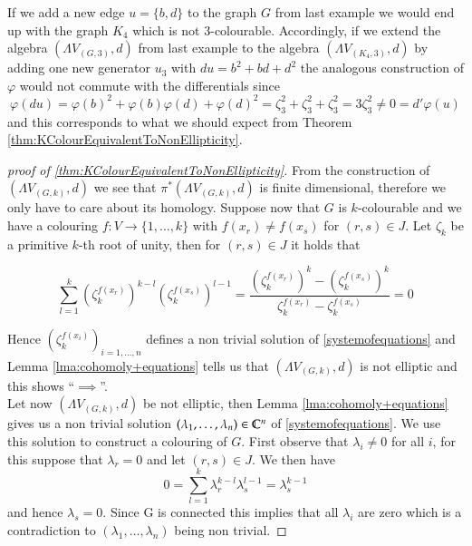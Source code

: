 \begin{Remark}
 If we add a new edge $ u = \lbrace b,d \rbrace$ to the graph $G$ from last example we would end up with the graph $K_4$ which
 is not $3$-colourable. Accordingly, if we extend the algebra $(\Lambda V_{(G,3)},d)$ from last example to the algebra
 $(\Lambda V_{(K_4,3)}, d)$ by adding one new generator $u_3$ with $du = b^2 + bd + d^2$ the analogous construction of $\varphi$ would
 not commute with the differentials since
 $$ \varphi(du) = \varphi(b)^2 + \varphi(b)\varphi(d) + \varphi(d)^2 = \zeta_3^2 + \zeta_3^2 + \zeta_3^2 = 3 \zeta_3^2 
 \neq 0 = d' \varphi(u)$$ 
 and this corresponds to what we should expect from Theorem \ref{thm:KColourEquivalentToNonEllipticity}.
\end{Remark}

 
 \begin{proof}[proof of \ref{thm:KColourEquivalentToNonEllipticity}]
  From the construction of $(\Lambda V_{(G,k)},d)$ we see that  $\pi^*(\Lambda V_{(G,k)},d)$ is finite dimensional, therefore
  we only have to care about its homology. Suppose now that $G$ is $k$-colourable and we have a colouring
  $f \colon V \to { \lbrace 1, \dotsc , k \rbrace }$ with $f(x_r) \neq f(x_s)$ for $(r,s) \in J$. Let $\zeta_k$ be a primitive 
  $k$-th root of unity, then for $(r,s) \in J$ it holds that
  
  $$ \sum_{l = 1}^k (\zeta_k^{f(x_r)})^{k-l} (\zeta_k^{f(x_s)})^{l-1}
  = \frac{(\zeta_k^{f(x_r)})^{k} - (\zeta_k^{f(x_s)})^{k}}{ \zeta_k^{f(x_r)} - \zeta_k^{f(x_s)}} = 0
  $$
  
  Hence $(\zeta_k^{f(x_i)})_{i = 1, \dotsc, n}$ defines a non trivial solution of \ref{systemofequations}
  and Lemma \ref{lma:cohomoly+equations} tells us that $(\Lambda V_{(G,k)},d)$ is not elliptic and this shows
  ``$\implies$''. \\
  Let now $(\Lambda V_{(G,k)},d)$ be not elliptic, then Lemma \ref{lma:cohomoly+equations} gives us a non trivial
  solution $(\lambda_1 , \dotsc, \lambda_n) \in \mathbb{C}^n$ of \ref{systemofequations}. We use this solution to construct
  a colouring of $G$. 
  First observe that $\lambda_i \neq 0$ for all $i$, for this suppose that $\lambda_r = 0$ and let $(r,s) \in J$.
  We then have 
  $$0 =\sum_{l = 1}^k \lambda_r^{k -l} \lambda_s^{l - 1} = \lambda_s^{k-1}$$
  and hence $\lambda_s = 0$. Since G is connected this implies that all $\lambda_i$ are zero which is a
  contradiction to $(\lambda_1, \ldots, \lambda_n)$ being non trivial.
  

\end{proof}
